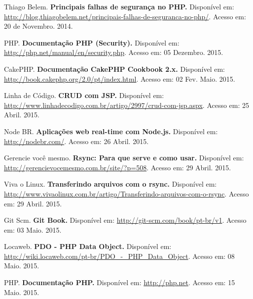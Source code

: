 \documentclass[brazil,ruledheader]{abntifes}
\begin{document}
\begin{thebibliography}{9}

    Thiago Belem. \textbf{Principais falhas de segurança no PHP.} Disponível em: \url{http://blog.thiagobelem.net/principais-falhas-de-seguranca-no-php/}.
    Acesso em: 20 de Novembro. 2014.

    PHP. \textbf{Documentação PHP (Security).} Disponível em: \url{http://php.net/manual/en/security.php}.
    Acesso em: 05 Dezembro. 2015.

    CakePHP. \textbf{Documentação CakePHP Cookbook 2.x.} Disponível em: \url{http://book.cakephp.org/2.0/pt/index.html}.
    Acesso em: 02 Fev. Maio. 2015.

    Linha de Código. \textbf{CRUD com JSP.} Disponível em: \url{http://www.linhadecodigo.com.br/artigo/2997/crud-com-jsp.aspx}.
    Acesso em: 25 Abril. 2015.

    Node BR. \textbf{Aplicações web real-time com Node.js.} Disponível em: \url{http://nodebr.com/}.
    Acesso em: 26 Abril. 2015.

    Gerencie você mesmo. \textbf{Rsync: Para que serve e como usar.} Disponível em: \url{http://gerencievocemesmo.com.br/site/?p=508}.
    Acesso em: 29 Abril. 2015.

    Viva o Linux. \textbf{Transferindo arquivos com o rsync.} Disponível em: \url{http://www.vivaolinux.com.br/artigo/Transferindo-arquivos-com-o-rsync}.
    Acesso em: 29 Abril. 2015.

    Git Scm. \textbf{Git Book.} Disponível em: \url{http://git-scm.com/book/pt-br/v1}.
    Acesso em: 03 Maio. 2015.

    Locaweb. \textbf{PDO - PHP Data Object.} Disponível em: \url{http://wiki.locaweb.com/pt-br/PDO_-_PHP_Data_Object}.
    Acesso em: 08 Maio. 2015.

    PHP. \textbf{Documentação PHP.} Disponível em: \url{http://php.net}.
    Acesso em: 15 Maio. 2015.


\end{thebibliography}


\anexo
\end{document}
